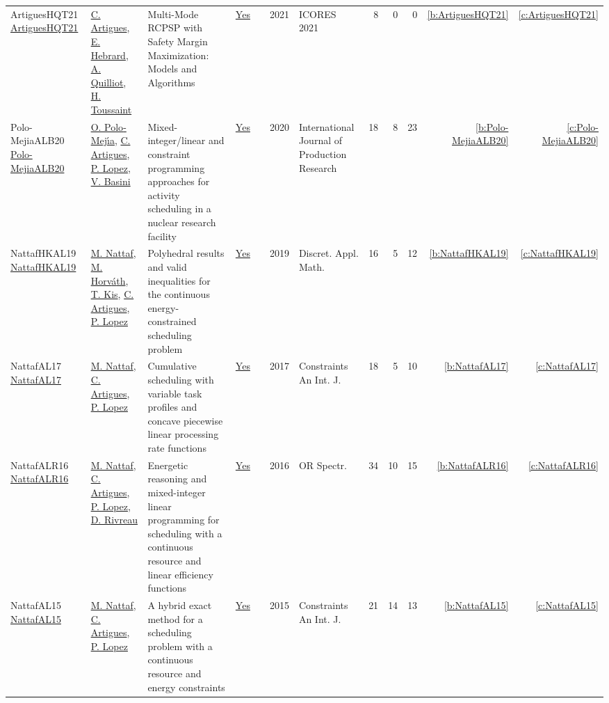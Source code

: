 {\begin{longtable}{>{\raggedright\arraybackslash}p{3cm}>{\raggedright\arraybackslash}p{6cm}>{\raggedright\arraybackslash}p{6.5cm}rrrp{2.5cm}rrrrr}
ArtiguesHQT21 \href{https://doi.org/10.5220/0010190101290136}{ArtiguesHQT21} & \hyperref[auth:a6]{C. Artigues}, \hyperref[auth:a1]{E. Hebrard}, \hyperref[auth:a801]{A. Quilliot}, \hyperref[auth:a802]{H. Toussaint} & Multi-Mode {RCPSP} with Safety Margin Maximization: Models and Algorithms & \href{../works/ArtiguesHQT21.pdf}{Yes} & \cite{ArtiguesHQT21} & 2021 & ICORES 2021 & 8 & 0 & 0 & \ref{b:ArtiguesHQT21} & \ref{c:ArtiguesHQT21}\\
Polo-MejiaALB20 \href{https://doi.org/10.1080/00207543.2019.1693654}{Polo-MejiaALB20} & \hyperref[auth:a524]{O. Polo{-}Mej{\'{\i}}a}, \hyperref[auth:a6]{C. Artigues}, \hyperref[auth:a3]{P. Lopez}, \hyperref[auth:a525]{V. Basini} & Mixed-integer/linear and constraint programming approaches for activity scheduling in a nuclear research facility & \href{../works/Polo-MejiaALB20.pdf}{Yes} & \cite{Polo-MejiaALB20} & 2020 & International Journal of Production Research & 18 & 8 & 23 & \ref{b:Polo-MejiaALB20} & \ref{c:Polo-MejiaALB20}\\
NattafHKAL19 \href{https://doi.org/10.1016/j.dam.2018.11.008}{NattafHKAL19} & \hyperref[auth:a81]{M. Nattaf}, \hyperref[auth:a1023]{M. Horv{\'{a}}th}, \hyperref[auth:a157]{T. Kis}, \hyperref[auth:a6]{C. Artigues}, \hyperref[auth:a3]{P. Lopez} & Polyhedral results and valid inequalities for the continuous energy-constrained scheduling problem & \href{../works/NattafHKAL19.pdf}{Yes} & \cite{NattafHKAL19} & 2019 & Discret. Appl. Math. & 16 & 5 & 12 & \ref{b:NattafHKAL19} & \ref{c:NattafHKAL19}\\
NattafAL17 \href{https://doi.org/10.1007/s10601-017-9271-4}{NattafAL17} & \hyperref[auth:a81]{M. Nattaf}, \hyperref[auth:a6]{C. Artigues}, \hyperref[auth:a3]{P. Lopez} & Cumulative scheduling with variable task profiles and concave piecewise linear processing rate functions & \href{../works/NattafAL17.pdf}{Yes} & \cite{NattafAL17} & 2017 & Constraints An Int. J. & 18 & 5 & 10 & \ref{b:NattafAL17} & \ref{c:NattafAL17}\\
NattafALR16 \href{https://doi.org/10.1007/s00291-015-0423-x}{NattafALR16} & \hyperref[auth:a81]{M. Nattaf}, \hyperref[auth:a6]{C. Artigues}, \hyperref[auth:a3]{P. Lopez}, \hyperref[auth:a1003]{D. Rivreau} & Energetic reasoning and mixed-integer linear programming for scheduling with a continuous resource and linear efficiency functions & \href{../works/NattafALR16.pdf}{Yes} & \cite{NattafALR16} & 2016 & {OR} Spectr. & 34 & 10 & 15 & \ref{b:NattafALR16} & \ref{c:NattafALR16}\\
NattafAL15 \href{https://doi.org/10.1007/s10601-015-9192-z}{NattafAL15} & \hyperref[auth:a81]{M. Nattaf}, \hyperref[auth:a6]{C. Artigues}, \hyperref[auth:a3]{P. Lopez} & A hybrid exact method for a scheduling problem with a continuous resource and energy constraints & \href{../works/NattafAL15.pdf}{Yes} & \cite{NattafAL15} & 2015 & Constraints An Int. J. & 21 & 14 & 13 & \ref{b:NattafAL15} & \ref{c:NattafAL15}\\

\end{longtable}}
